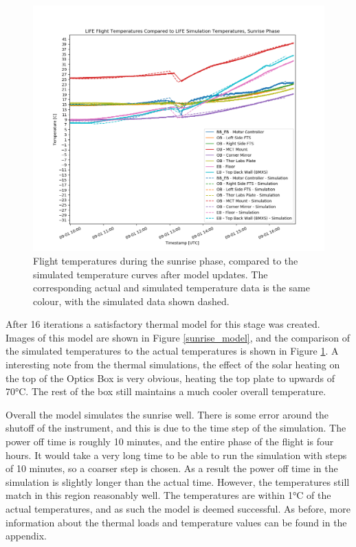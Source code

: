 \begin{figure}
    \centering
    \includegraphics[width=\textwidth]{chap4_images/sunrise_images/Sunrise_temps_with_sims_V2.png}
    \caption{Flight temperatures during the sunrise phase, compared to the simulated temperature curves after model updates. The corresponding actual and simulated temperature data is the same colour, with the simulated data shown dashed.}
    \label{fig:sunrise_temps_with_sims}
\end{figure}

After 16 iterations a satisfactory thermal model for this stage was created. Images of this model are shown in Figure \ref{sunrise_model}, and the comparison of the simulated temperatures to the actual temperatures is shown in Figure \ref{fig:sunrise_temps_with_sims}. A interesting note from the thermal simulations, the effect of the solar heating on the top of the Optics Box is very obvious, heating the top plate to upwards of 70°C. The rest of the box still maintains a much cooler overall temperature.

Overall the model simulates the sunrise well. There is some error around the shutoff of the instrument, and this is due to the time step of the simulation. The power off time is roughly 10 minutes, and the entire phase of the flight is four hours. It would take a very long time to be able to run the simulation with steps of 10 minutes, so a coarser step is chosen. As a result the power off time in the simulation is slightly longer than the actual time. However, the temperatures still match in this region reasonably well. The temperatures are within 1°C of the actual temperatures, and as such the model is deemed successful. As before, more information about the thermal loads and temperature values can be found in the appendix.

